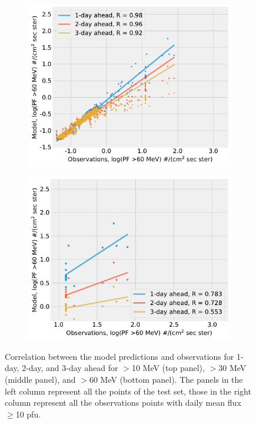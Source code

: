 \begin{figure}[!htp]
\begin{subfigure}{0.4\textwidth}
         \centering
         \includegraphics[width=\textwidth]{chapter4/figs/scatterplot_obs_vs_model_tstset_3in1_log_PF60.pdf}
    \end{subfigure}
    \begin{subfigure}{0.4\textwidth}
         \centering
         \includegraphics[width=\textwidth]{chapter4/figs/scatterplot_obs_vs_model_tstset_3in1_LOG_PF_LT1_log_PF60.pdf}
    \end{subfigure}
	\caption{Correlation between the model predictions and observations for 1-day, 2-day, and 3-day ahead for $>$10 MeV (top panel), $>$30 MeV (middle panel), and $>$60 MeV (bottom panel). The panels in the left column represent all the points of the test set, those in the right column represent all the observations points with daily mean flux $\geq$10 pfu.}
	\label{fig_model_vs_obs_tstset}
\end{figure}

